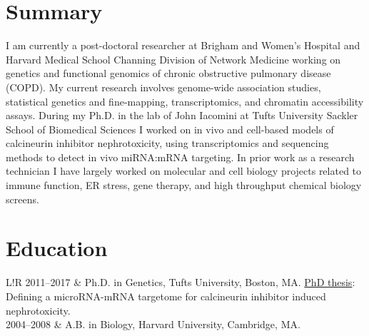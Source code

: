 \documentclass[letterpaper, 10pt]{article}
\newcommand\VRule{\color{lightgray}\vrule width 0.5pt}
\begin{document}
\section*{Summary}

I am currently a post-doctoral researcher at Brigham and Women's Hospital and Harvard Medical School Channing Division of Network Medicine working on genetics and functional genomics of chronic obstructive pulmonary disease (COPD). My current research involves genome-wide association studies, statistical genetics and fine-mapping, transcriptomics, and chromatin accessibility assays.  During my Ph.D. in the lab of John Iacomini at Tufts University Sackler School of Biomedical Sciences I worked on in vivo and cell-based models of calcineurin inhibitor nephrotoxicity, using transcriptomics and sequencing methods to detect in vivo miRNA:mRNA targeting. In prior work as a research technician I have largely worked on molecular and cell biology projects related to immune function, ER stress, gene therapy, and high throughput chemical biology screens. 


\section*{Education}
\begin{tabular}{L!{\VRule}R}
   2011--2017 & Ph.D. in Genetics, Tufts University, Boston, MA. \href{https://github.com/cbenway/cv/blob/master/phd_thesis.pdf}{PhD thesis}: Defining a microRNA-mRNA targetome for calcineurin inhibitor induced nephrotoxicity.\\
   2004--2008 & A.B. in Biology, Harvard University, Cambridge, MA.
\end{tabular}
\end{document}
